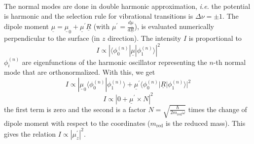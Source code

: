 \documentclass[11pt,DIV=13,BCOR=5mm,a4paper,headinclude]{scrbook}
\renewcommand{\vec}[1]{\underline{#1}}
\begin{document}
\begin{itemize}
 {\color{red}The normal modes are done in double harmonic approximation, \textit{i.e.} the potential is harmonic and the selection rule for vibrational transitions is $\Delta \nu=\pm1$.
 The dipole moment $\vec{\mu}=\vec{\mu}_0 + \vec{\mu}^\prime \vec{R}$ (with  $\mu^\prime=\frac{d\vec{\mu}}{d\vec{R}}$), is evaluated numerically perpendicular to the surface (in $z$ direction).
 The intensity $I$ is proportional to 
 \begin{equation}
 I\propto |\langle \phi_0^{(n)}|\vec{\mu}|\phi_1^{(n)} \rangle|^2
 \end{equation}
 $\phi_i^{(n)}$ are eigenfunctions of the harmonic oscillator representing the $n$-th normal mode that are orthonormalized.
 With this, we get
 \begin{equation}
  I\propto |\vec{\mu}_0\langle \phi_0^{(n)}|\phi_1^{(n)} \rangle + \vec{\mu}^\prime\langle \phi_0^{(n)}|\vec{R}|\phi_1^{(n)} \rangle|^2
 \end{equation}
 \begin{equation}
  I\propto |0 + \vec{\mu}^\prime\times N|^2
 \end{equation}
 the first term is zero and the second is a factor $N=\sqrt{\frac{\hbar}{2m_\textrm{red}\omega}}$\cite{cohen-tannoudji} times the change of dipole moment with respect to the coordinates ($m_\textrm{red}$ is the reduced mass).
 This gives the relation $I\propto |\mu^\prime_z|^2$\cite{dyn-dip,Yang2012}.
}
\end{itemize}
\end{document}
